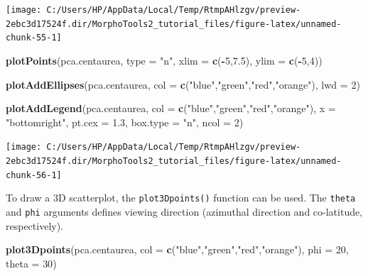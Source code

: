 \documentclass[
]{article}
\newenvironment{Shaded}{\begin{snugshade}}{\end{snugshade}}
\newcommand{\DataTypeTok}[1]{\textcolor[rgb]{0.13,0.29,0.53}{#1}}
\newcommand{\DecValTok}[1]{\textcolor[rgb]{0.00,0.00,0.81}{#1}}
\newcommand{\FloatTok}[1]{\textcolor[rgb]{0.00,0.00,0.81}{#1}}
\newcommand{\KeywordTok}[1]{\textcolor[rgb]{0.13,0.29,0.53}{\textbf{#1}}}
\newcommand{\NormalTok}[1]{#1}
\newcommand{\OperatorTok}[1]{\textcolor[rgb]{0.81,0.36,0.00}{\textbf{#1}}}
\newcommand{\StringTok}[1]{\textcolor[rgb]{0.31,0.60,0.02}{#1}}
\begin{document}
\begin{center}\texttt{[image: C:/Users/HP/AppData/Local/Temp/RtmpAHlzgv/preview-2ebc3d17524f.dir/MorphoTools2\_tutorial\_files/figure-latex/unnamed-chunk-55-1]} \end{center}

\begin{Shaded}
\begin{Highlighting}[]
\KeywordTok{plotPoints}\NormalTok{(pca.centaurea, }\DataTypeTok{type =} \StringTok{"n"}\NormalTok{, }\DataTypeTok{xlim =} \KeywordTok{c}\NormalTok{(}\OperatorTok{-}\DecValTok{5}\NormalTok{,}\FloatTok{7.5}\NormalTok{), }\DataTypeTok{ylim =} \KeywordTok{c}\NormalTok{(}\OperatorTok{-}\DecValTok{5}\NormalTok{,}\DecValTok{4}\NormalTok{))}

\KeywordTok{plotAddEllipses}\NormalTok{(pca.centaurea, }\DataTypeTok{col =} \KeywordTok{c}\NormalTok{(}\StringTok{"blue"}\NormalTok{,}\StringTok{"green"}\NormalTok{,}\StringTok{"red"}\NormalTok{,}\StringTok{"orange"}\NormalTok{), }\DataTypeTok{lwd =} \DecValTok{2}\NormalTok{)}

\KeywordTok{plotAddLegend}\NormalTok{(pca.centaurea, }\DataTypeTok{col =} \KeywordTok{c}\NormalTok{(}\StringTok{"blue"}\NormalTok{,}\StringTok{"green"}\NormalTok{,}\StringTok{"red"}\NormalTok{,}\StringTok{"orange"}\NormalTok{), }
              \DataTypeTok{x =} \StringTok{"bottomright"}\NormalTok{, }\DataTypeTok{pt.cex =} \FloatTok{1.3}\NormalTok{, }\DataTypeTok{box.type =} \StringTok{"n"}\NormalTok{, }\DataTypeTok{ncol =} \DecValTok{2}\NormalTok{)}
\end{Highlighting}
\end{Shaded}

\begin{center}\texttt{[image: C:/Users/HP/AppData/Local/Temp/RtmpAHlzgv/preview-2ebc3d17524f.dir/MorphoTools2\_tutorial\_files/figure-latex/unnamed-chunk-56-1]} \end{center}

To draw a 3D scatterplot, the \texttt{plot3Dpoints()} function can be
used. The \texttt{theta} and \texttt{phi} arguments defines viewing
direction (azimuthal direction and co-latitude, respectively).

\begin{Shaded}
\begin{Highlighting}[]
\KeywordTok{plot3Dpoints}\NormalTok{(pca.centaurea, }\DataTypeTok{col =} \KeywordTok{c}\NormalTok{(}\StringTok{"blue"}\NormalTok{,}\StringTok{"green"}\NormalTok{,}\StringTok{"red"}\NormalTok{,}\StringTok{"orange"}\NormalTok{), }\DataTypeTok{phi =} \DecValTok{20}\NormalTok{, }\DataTypeTok{theta =} \DecValTok{30}\NormalTok{)}
\end{Highlighting}
\end{Shaded}
\end{document}

